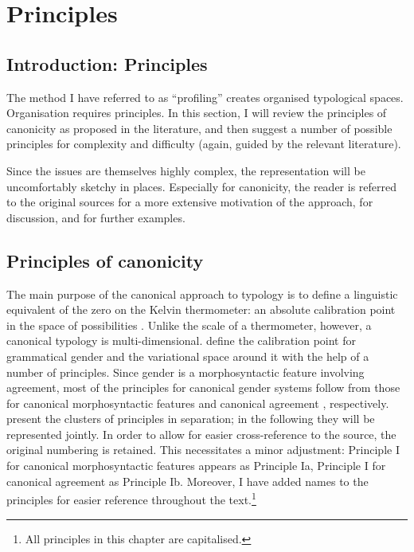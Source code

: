 \documentclass[output=collectionpaper]{langsci/langscibook}
\begin{document}
\section{Principles}
\label{sec:Audr:2}

\subsection{Introduction: Principles}

The method I have referred to as ``profiling'' creates organised typological spaces. Organisation requires principles. In this section, I will review the principles of canonicity as proposed in the literature, and then suggest a number of possible principles for complexity and difficulty (again, guided by the relevant literature).

Since the issues are themselves highly complex, the representation will be uncomfortably sketchy in places. Especially for canonicity, the reader is referred to the original sources for a more extensive motivation of the approach, for discussion, and for further examples.

\subsection{Principles of canonicity}
\label{sec:Audr:2.2}

The main purpose of the canonical approach to typology is to define a linguistic equivalent of the zero on the Kelvin thermometer: an absolute calibration point in the space of possibilities \citep{Fedden2015}. Unlike the scale of a thermometer, however, a canonical typology is multi-dimensional. \citet{Corbett2016} define the calibration point for grammatical gender and the variational space around it with the help of a number of principles. Since gender is a morphosyntactic feature involving agreement, most of the principles for canonical gender systems follow from those for canonical morphosyntactic features \citep{Corbett2012} and canonical agreement \citep{Corbett2006}, respectively. \citet{Corbett2016} present the clusters of principles in separation; in the following they will be represented jointly. In order to allow for easier cross-reference to the source, the original numbering is retained. This necessitates a minor adjustment: Principle I for canonical morphosyntactic features appears as Principle Ia, Principle I for canonical agreement as Principle Ib. Moreover, I have added names to the principles for easier reference throughout the text.\footnote{All principles in this chapter are capitalised.}
\end{document}
